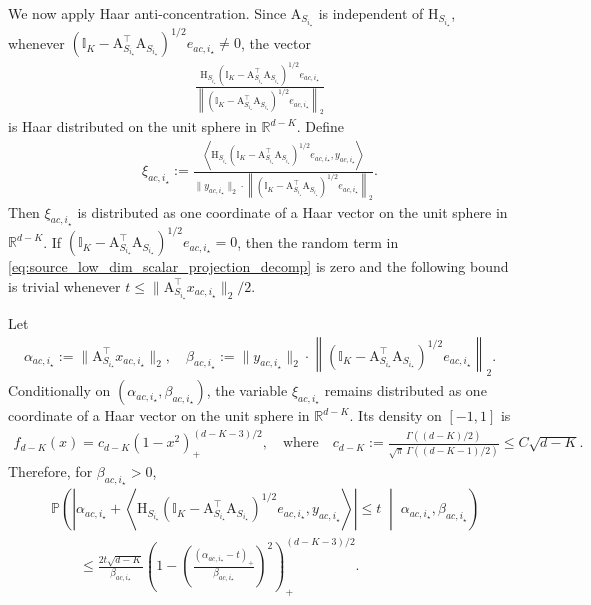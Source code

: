 \documentclass[10pt]{article}
\newcommand{\R}{\mathbb R}
\newcommand{\Id}{\mathbb I}
\newcommand{\src}{S}
\begin{document}
We now apply Haar anti-concentration. Since $\mathrm A_{\src_{i_\star}}$ is independent of $\mathrm H_{\src_{i_\star}}$, whenever $\left(\Id_K-\mathrm A_{\src_{i_\star}}^\top\mathrm A_{\src_{i_\star}}\right)^{1/2}e_{ac,i_\star}\neq0$, the vector
\begin{align}
    \frac{\mathrm H_{\src_{i_\star}}\left(\Id_K-\mathrm A_{\src_{i_\star}}^\top\mathrm A_{\src_{i_\star}}\right)^{1/2}e_{ac,i_\star}}{\left\|\left(\Id_K-\mathrm A_{\src_{i_\star}}^\top\mathrm A_{\src_{i_\star}}\right)^{1/2}e_{ac,i_\star}\right\|_2}
\end{align}
is Haar distributed on the unit sphere in $\R^{d-K}$. Define
\begin{align}
\label{eq:source_low_dim_haar_coordinate}
    \xi_{ac,i_\star}:=\frac{\left\langle \mathrm H_{\src_{i_\star}}\left(\Id_K-\mathrm A_{\src_{i_\star}}^\top\mathrm A_{\src_{i_\star}}\right)^{1/2}e_{ac,i_\star},y_{ac,i_\star}\right\rangle}{\|y_{ac,i_\star}\|_2\cdot\left\|\left(\Id_K-\mathrm A_{\src_{i_\star}}^\top\mathrm A_{\src_{i_\star}}\right)^{1/2}e_{ac,i_\star}\right\|_2}.
\end{align}
Then $\xi_{ac,i_\star}$ is distributed as one coordinate of a Haar vector on the unit sphere in $\R^{d-K}$. If $\left(\Id_K-\mathrm A_{\src_{i_\star}}^\top\mathrm A_{\src_{i_\star}}\right)^{1/2}e_{ac,i_\star}=0$, then the random term in \eqref{eq:source_low_dim_scalar_projection_decomp} is zero and the following bound is trivial whenever $t\le \|\mathrm A_{\src_{i_\star}}^\top x_{ac,i_\star}\|_2/2$.

Let
\begin{align}
    \alpha_{ac,i_\star}:=\|\mathrm A_{\src_{i_\star}}^\top x_{ac,i_\star}\|_2, \quad \beta_{ac,i_\star}:=\|y_{ac,i_\star}\|_2\cdot\left\|\left(\Id_K-\mathrm A_{\src_{i_\star}}^\top\mathrm A_{\src_{i_\star}}\right)^{1/2}e_{ac,i_\star}\right\|_2.
\end{align}
Conditionally on $(\alpha_{ac,i_\star},\beta_{ac,i_\star})$, the variable $\xi_{ac,i_\star}$ remains distributed as one coordinate of a Haar vector on the unit sphere in $\R^{d-K}$. Its density on $[-1,1]$ is
\begin{align}
    f_{d-K}(x)=c_{d-K}(1-x^2)_+^{(d-K-3)/2}, \quad \mbox{where}\quad c_{d-K}:=\frac{\Gamma((d-K)/2)}{\sqrt{\pi}\,\Gamma((d-K-1)/2)}\le C\sqrt{d-K}.
\end{align}
Therefore, for $\beta_{ac,i_\star}>0$,
\begin{align}
\label{eq:source_low_dim_conditional_small_ball}
    &\mathbb P\left(\left|\alpha_{ac,i_\star}+\left\langle \mathrm H_{\src_{i_\star}}\left(\Id_K-\mathrm A_{\src_{i_\star}}^\top\mathrm A_{\src_{i_\star}}\right)^{1/2}e_{ac,i_\star},y_{ac,i_\star}\right\rangle\right|\le t\;\middle|\;\alpha_{ac,i_\star},\beta_{ac,i_\star}\right)\\
    &\qquad\le \frac{2t\sqrt{d-K}}{\beta_{ac,i_\star}}\left(1-\left(\frac{(\alpha_{ac,i_\star}-t)_+}{\beta_{ac,i_\star}}\right)^2\right)_+^{(d-K-3)/2}.
\end{align}
\end{document}

